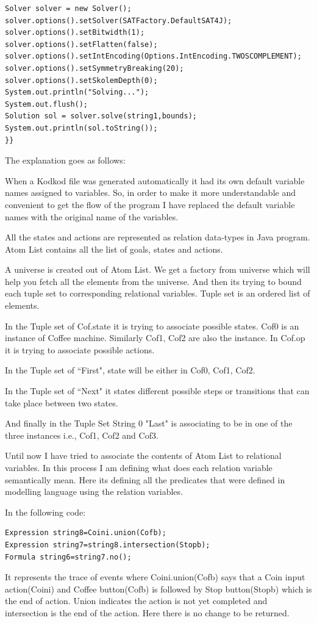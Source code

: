 \documentclass[a4paper,12pt]{report}
\begin{document}
\begin{verbatim}
Solver solver = new Solver();
solver.options().setSolver(SATFactory.DefaultSAT4J);
solver.options().setBitwidth(1);
solver.options().setFlatten(false);
solver.options().setIntEncoding(Options.IntEncoding.TWOSCOMPLEMENT);
solver.options().setSymmetryBreaking(20);
solver.options().setSkolemDepth(0);
System.out.println("Solving...");
System.out.flush();
Solution sol = solver.solve(string1,bounds);
System.out.println(sol.toString());
}}

\end{verbatim}
The explanation goes as follows:

When a Kodkod file was generated automatically it had its own default variable names assigned to variables. So, in order to make it more understandable and convenient to get the flow of the program I have replaced the default variable names with the original name of the variables.

All the states and actions are represented as relation data-types in Java program. Atom List contains all the list of goals, states and actions. 

A universe is created out of Atom List. We get a factory from universe which will help you fetch all the elements from the universe. And then its trying to  bound each tuple set to corresponding relational variables. Tuple set is an ordered list of elements. 

In the Tuple set of Cof.state it is trying to associate possible states. Cof0 is an instance of Coffee machine. Similarly Cof1, Cof2 are also the instance. In Cof.op it is trying to associate possible actions.

In the Tuple set of ``First", state will be either in Cof0, Cof1, Cof2. 
 
In the Tuple set of ``Next" it states different possible steps or transitions that can take place between two states.  

And finally in the Tuple Set String 0 "Last" is associating to be in one of the three instances i.e., Cof1, Cof2 and Cof3.

Until now I have tried to associate the contents of Atom List to relational variables. In this process I am defining what does each relation variable semantically mean. Here its defining all the predicates that were defined in modelling language using the relation variables. 

In the following code:

\begin{verbatim}
Expression string8=Coini.union(Cofb);
Expression string7=string8.intersection(Stopb);
Formula string6=string7.no();
\end{verbatim}
It represents the trace of events where Coini.union(Cofb) says that a Coin input action(Coini) and Coffee button(Cofb) is followed by Stop button(Stopb) which is the end of action. Union indicates the action is not yet completed and intersection is the end of the action. Here there is no change to be returned.
\end{document}

